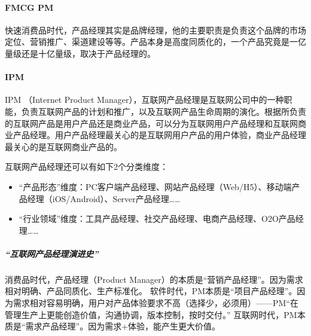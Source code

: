 \documentclass[letterpaper,11pt,english]{sphinxmanual}
\begin{document}
\paragraph{FMCG PM}
\label{\detokenize{chapter_introduction/AI_PM:fmcg-pm}}
快速消费品时代，产品经理其实是品牌经理，他的主要职责是负责这个品牌的市场定位、营销推广、渠道建设等等。产品本身是高度同质化的，一个产品究竟是一亿量级还是十亿量级，取决于产品经理的。


\paragraph{IPM}
\label{\detokenize{chapter_introduction/AI_PM:ipm}}
IPM （Internet Product
Manager），互联网产品经理是互联网公司中的一种职能，负责互联网产品的计划和推广，以及互联网产品生命周期的演化。根据所负责的互联网产品是用户产品还是商业产品，可以分为互联网用户产品经理和互联网商业产品经理。用户产品经理最关心的是互联网用户产品的用户体验，商业产品经理最关心的是互联网商业产品的。

互联网产品经理还可以有如下2个分类维度：
\begin{itemize}
\item {} 
“产品形态”维度：PC客户端产品经理、网站产品经理（Web/H5）、移动端产品经理（iOS/Android）、Server产品经理……

\item {} 
“行业领域”维度：工具产品经理、社交产品经理、电商产品经理、O2O产品经理……

\end{itemize}


\subparagraph{“互联网产品经理演进史”}
\label{\detokenize{chapter_introduction/AI_PM:id1}}
消费品时代，产品经理（Product
Manager）的本质是“营销产品经理”。因为需求相对明确、产品同质化、生产标准化。
软件时代，PM本质是“项目产品经理”。因为需求相对容易明确，用户对产品体验要求不高（选择少，必须用）——PM“在管理生产上更能创造价值，沟通协调，版本控制，按时交付。”
互联网时代，PM本质是“需求产品经理”。因为需求+体验，能产生更大价值。
\end{document}

